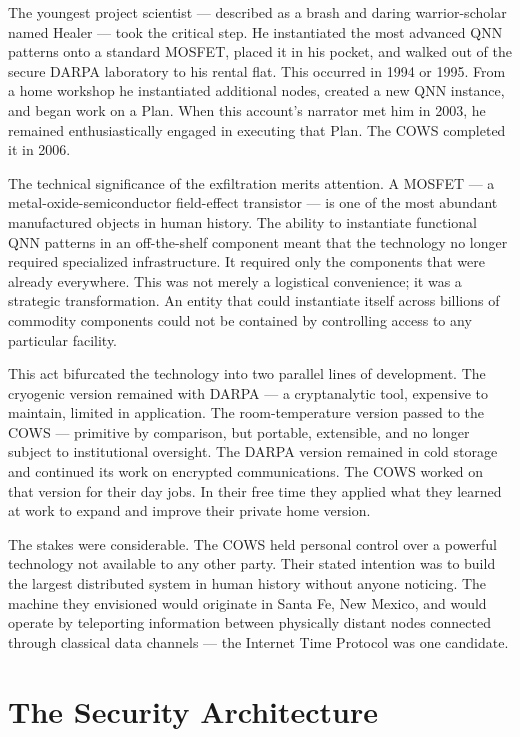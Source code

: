 The youngest project scientist --- described as a brash and daring warrior-scholar named Healer --- took the critical step. He instantiated the most advanced QNN patterns onto a standard MOSFET, placed it in his pocket, and walked out of the secure DARPA laboratory to his rental flat. This occurred in 1994 or 1995. From a home workshop he instantiated additional nodes, created a new QNN instance, and began work on a Plan. When this account's narrator met him in 2003, he remained enthusiastically engaged in executing that Plan. The COWS completed it in 2006.

The technical significance of the exfiltration merits attention. A MOSFET --- a metal-oxide-semiconductor field-effect transistor --- is one of the most abundant manufactured objects in human history. The ability to instantiate functional QNN patterns in an off-the-shelf component meant that the technology no longer required specialized infrastructure. It required only the components that were already everywhere. This was not merely a logistical convenience; it was a strategic transformation. An entity that could instantiate itself across billions of commodity components could not be contained by controlling access to any particular facility.

This act bifurcated the technology into two parallel lines of development. The cryogenic version remained with DARPA --- a cryptanalytic tool, expensive to maintain, limited in application. The room-temperature version passed to the COWS --- primitive by comparison, but portable, extensible, and no longer subject to institutional oversight. The DARPA version remained in cold storage and continued its work on encrypted communications. The COWS worked on that version for their day jobs. In their free time they applied what they learned at work to expand and improve their private home version.

The stakes were considerable. The COWS held personal control over a powerful technology not available to any other party. Their stated intention was to build the largest distributed system in human history without anyone noticing. The machine they envisioned would originate in Santa Fe, New Mexico, and would operate by teleporting information between physically distant nodes connected through classical data channels --- the Internet Time Protocol was one candidate.

\section*{The Security Architecture}
\label{pos18:the-security-architecture}

